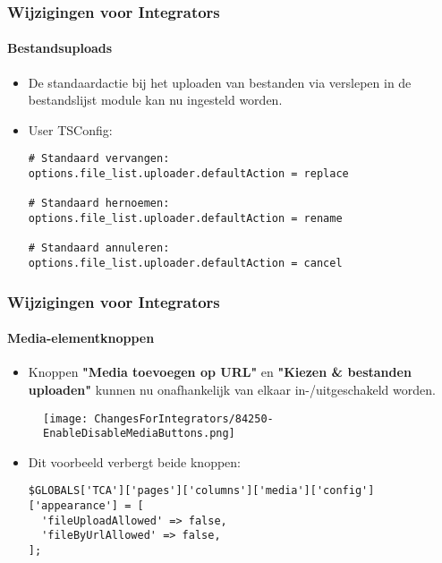 
\begin{frame}[fragile]
	\frametitle{Wijzigingen voor Integrators}
	\framesubtitle{Bestandsuploads}

	\lstset{basicstyle=\smaller\ttfamily}

	\begin{itemize}
		\item De standaardactie bij het uploaden van bestanden via verslepen in de bestandslijst module kan nu ingesteld worden.
		\item User TSConfig:

\begin{lstlisting}
# Standaard vervangen:
options.file_list.uploader.defaultAction = replace

# Standaard hernoemen:
options.file_list.uploader.defaultAction = rename

# Standaard annuleren:
options.file_list.uploader.defaultAction = cancel
\end{lstlisting}

	\end{itemize}

\end{frame}


\begin{frame}[fragile]
	\frametitle{Wijzigingen voor Integrators}
	\framesubtitle{Media-elementknoppen}

	\lstset{basicstyle=\tiny\ttfamily}

	\begin{itemize}
		\item Knoppen \textbf{"Media toevoegen op URL"} en \textbf{"Kiezen \& bestanden uploaden"}
			kunnen nu onafhankelijk van elkaar in-/uitgeschakeld worden.
	\end{itemize}

	\begin{figure}
		\texttt{[image: ChangesForIntegrators/84250-EnableDisableMediaButtons.png]}
	\end{figure}

	\begin{itemize}
		\item Dit voorbeeld verbergt beide knoppen:

\begin{lstlisting}
$GLOBALS['TCA']['pages']['columns']['media']['config']['appearance'] = [
  'fileUploadAllowed' => false,
  'fileByUrlAllowed' => false,
];
\end{lstlisting}

	\end{itemize}

\end{frame}

